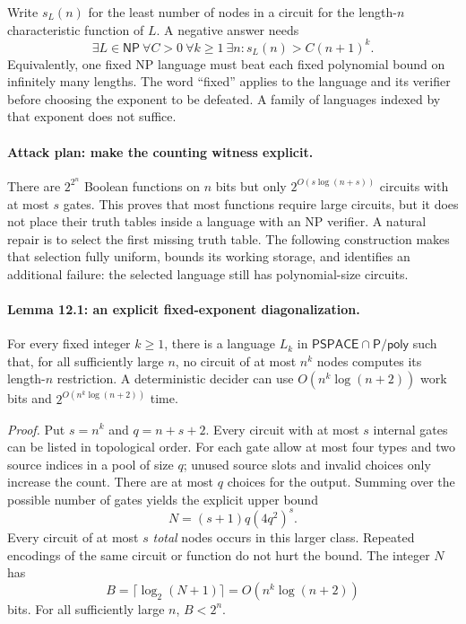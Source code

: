\documentclass[11pt]{article}
\begin{document}
Write $s_L(n)$ for the least number of nodes in a circuit for the length-$n$
characteristic function of $L$. A negative answer needs
\[
 \exists L\in\mathsf{NP}\ \forall C>0\ \forall k\ge1\ \exists n:
                       s_L(n)>C(n+1)^k.
\]
Equivalently, one fixed NP language must beat each fixed polynomial bound
on infinitely many lengths. The word ``fixed'' applies to the language and
its verifier before choosing the exponent to be defeated. A family of
languages indexed by that exponent does not suffice.

\paragraph{Attack plan: make the counting witness explicit.}
There are $2^{2^n}$ Boolean functions on $n$ bits but only
$2^{O(s\log(n+s))}$ circuits with at most $s$ gates. This proves that most
functions require large circuits, but it does not place their truth tables
inside a language with an NP verifier. A natural repair is to select the
first missing truth table. The following construction makes that selection
fully uniform, bounds its working storage, and identifies an additional
failure: the selected language still has polynomial-size circuits.

\paragraph{Lemma 12.1: an explicit fixed-exponent diagonalization.}
For every fixed integer $k\ge1$, there is a language $L_k$ in
$\mathsf{PSPACE}\cap\mathsf{P/poly}$ such that, for all sufficiently large
$n$, no circuit of at most $n^k$ nodes computes its length-$n$ restriction.
A deterministic decider can use $O(n^k\log(n+2))$ work bits and
$2^{O(n^k\log(n+2))}$ time.

\emph{Proof.} Put $s=n^k$ and $q=n+s+2$. Every circuit with at most $s$
internal gates can be listed in topological order. For each gate allow at
most four types and two source indices in a pool of size $q$; unused source
slots and invalid choices only increase the count. There are at most $q$
choices for the output. Summing over the possible number of gates yields
the explicit upper bound
\begin{equation}\label{a12:count}
                 N=(s+1)q(4q^2)^s.
\end{equation}
Every circuit of at most $s$ \emph{total} nodes occurs in this larger class.
Repeated encodings of the same circuit or function do not hurt the bound.
The integer $N$ has
\[
                    B=\lceil\log_2(N+1)\rceil
                       =O(n^k\log(n+2))
\]
bits. For all sufficiently large $n$, $B<2^n$.
\end{document}
